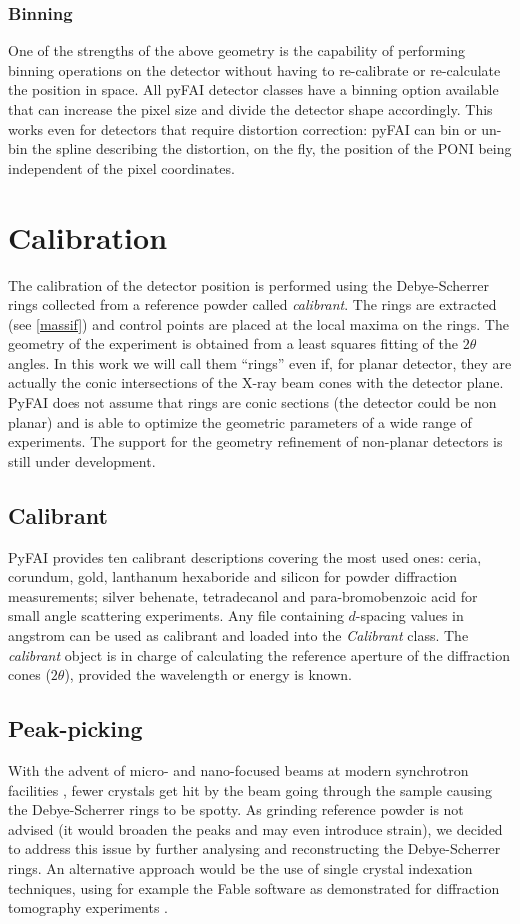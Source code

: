 \documentclass{iucr}
\begin{document}
\subsubsection{Binning}
One of the strengths of the above geometry is the capability of performing
binning operations on the detector without having to re-calibrate or
re-calculate the position in space.
All pyFAI detector classes have a binning option available that can increase the
pixel size and divide the detector shape accordingly.
This works even for detectors that require distortion correction: pyFAI can bin
or un-bin the spline describing the distortion, on the fly, the position of the
PONI being independent of the pixel coordinates.

\section{Calibration}

The calibration of the detector position is performed using the Debye-Scherrer
rings collected from a reference powder called \textit{calibrant}.
The rings are extracted (see \ref{massif}) and control points are placed at the
local maxima on the rings.
The geometry of the experiment is obtained from a least squares fitting of
the $2\theta$ angles.
In this work we will call them ``rings'' even if, for planar detector,
they are actually the conic intersections of the X-ray beam cones
with the detector plane.
PyFAI does not assume that rings are conic sections (the detector could
be non planar) and is able to optimize the
geometric parameters of a wide range of experiments.
The support for the geometry refinement of non-planar detectors is still under
development.

\subsection{Calibrant}
PyFAI provides ten calibrant descriptions covering the most used ones: ceria,
corundum, gold, lanthanum hexaboride and silicon for powder diffraction
measurements; silver behenate, tetradecanol and para-bromobenzoic acid for small
angle scattering experiments.
Any file containing $d$-spacing values in angstrom can be used as calibrant and
loaded into the \textit{Calibrant} class.
The \textit{calibrant} object is in charge of
calculating the reference aperture of the diffraction cones ($2\theta$),
provided the wavelength or energy is known.

\subsection{Peak-picking}
With the advent of micro- and nano-focused beams at modern synchrotron
facilities \cite{id13}, fewer crystals get hit by the beam going through the
sample causing the Debye-Scherrer rings to be spotty.
As grinding reference powder is not advised (it would broaden the peaks
and may even introduce strain), we decided to
address this issue by further analysing and reconstructing the Debye-Scherrer rings.
An alternative approach would be the use of single crystal indexation techniques, using
for example the Fable software \cite{fable} as demonstrated for diffraction
tomography experiments \cite{bonnin}.
\end{document}
